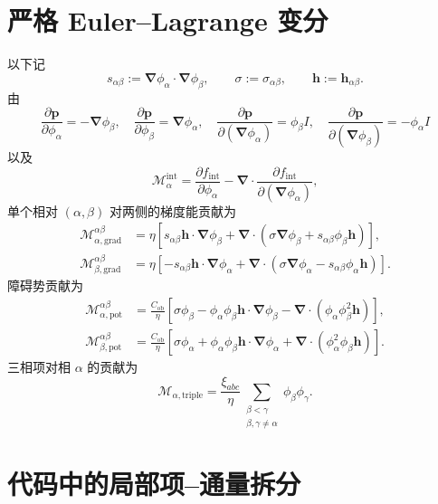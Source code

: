 \documentclass[UTF8,a4paper,11pt]{ctexart}
\newcommand{\grad}{\bm{\nabla}}
\newcommand{\diver}{\bm{\nabla}\!\cdot}
\newcommand{\vct}[1]{\bm{#1}}
\begin{document}
\section{严格 Euler--Lagrange 变分}

以下记
\[
 s_{\alpha\beta}:=\grad\phi_\alpha\cdot\grad\phi_\beta,\qquad
 \sigma:=\sigma_{\alpha\beta},\qquad
 \vct h:=\vct h_{\alpha\beta}.
\]
由
\[
 \frac{\partial\vct p}{\partial\phi_\alpha}=-\grad\phi_\beta,\quad
 \frac{\partial\vct p}{\partial\phi_\beta}=\grad\phi_\alpha,\quad
 \frac{\partial\vct p}{\partial(\grad\phi_\alpha)}=\phi_\beta I,\quad
 \frac{\partial\vct p}{\partial(\grad\phi_\beta)}=-\phi_\alpha I
\]
以及
\[
 \mathcal M_\alpha^{\mathrm{int}}
 =\frac{\partial f_{\mathrm{int}}}{\partial\phi_\alpha}
 -\diver\frac{\partial f_{\mathrm{int}}}
                 {\partial(\grad\phi_\alpha)},
\]
单个相对 \((\alpha,\beta)\) 对两侧的梯度能贡献为
\begin{align}
 \mathcal M_{\alpha,\mathrm{grad}}^{\alpha\beta}
 &=\eta\left[
 s_{\alpha\beta}\vct h\cdot\grad\phi_\beta
 +\diver\left(
 \sigma\grad\phi_\beta+s_{\alpha\beta}\phi_\beta\vct h
 \right)\right],\\
 \mathcal M_{\beta,\mathrm{grad}}^{\alpha\beta}
 &=\eta\left[
 -s_{\alpha\beta}\vct h\cdot\grad\phi_\alpha
 +\diver\left(
 \sigma\grad\phi_\alpha-s_{\alpha\beta}\phi_\alpha\vct h
 \right)\right].
\end{align}
障碍势贡献为
\begin{align}
 \mathcal M_{\alpha,\mathrm{pot}}^{\alpha\beta}
 &=\frac{C_{\mathrm{ob}}}{\eta}\left[
 \sigma\phi_\beta
 -\phi_\alpha\phi_\beta\vct h\cdot\grad\phi_\beta
 -\diver(\phi_\alpha\phi_\beta^2\vct h)
 \right],\\
 \mathcal M_{\beta,\mathrm{pot}}^{\alpha\beta}
 &=\frac{C_{\mathrm{ob}}}{\eta}\left[
 \sigma\phi_\alpha
 +\phi_\alpha\phi_\beta\vct h\cdot\grad\phi_\alpha
 +\diver(\phi_\alpha^2\phi_\beta\vct h)
 \right].
\end{align}
三相项对相 \(\alpha\) 的贡献为
\begin{equation}
 \mathcal M_{\alpha,\mathrm{triple}}
 =\frac{\xi_{abc}}{\eta}
 \sum_{\substack{\beta<\gamma\\\beta,\gamma\ne\alpha}}
 \phi_\beta\phi_\gamma .
\end{equation}

\section{代码中的局部项--通量拆分}
\end{document}
